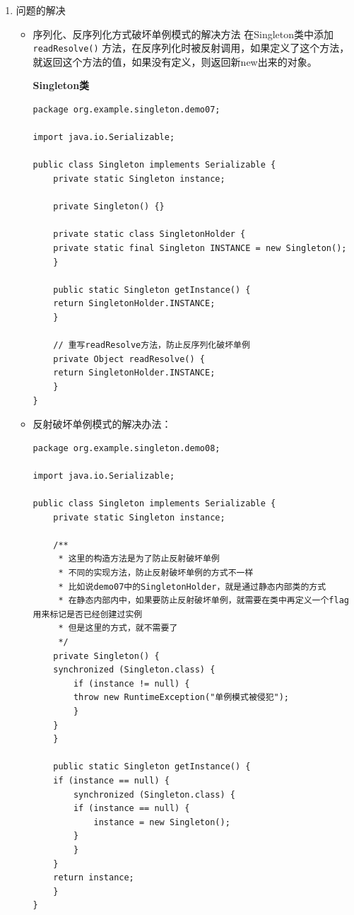 \documentclass[11pt]{article}
\begin{document}
\begin{enumerate}
\begin{itemize}
\begin{verbatim}
	// 获取无参构造方法
	Constructor cons = clazz.getDeclaredConstructor();

	// 取消访问检查
	cons.setAccessible(true);

	// 创建对象
	Singleton s1 = (Singleton) cons.newInstance();
	Singleton s2 = (Singleton) cons.newInstance();

	/**
	 * false
	 */
	System.out.println(s1 == s2);
    }
}

\end{verbatim}
\end{itemize}
\item 问题的解决
\label{sec:org3c0c33a}
\begin{itemize}
\item 序列化、反序列化方式破坏单例模式的解决方法
在Singleton类中添加 \texttt{readResolve()} 方法，在反序列化时被反射调用，如果定义了这个方法，就返回这个方法的值，如果没有定义，则返回新new出来的对象。

\textbf{Singleton类}
\begin{verbatim}
package org.example.singleton.demo07;

import java.io.Serializable;

public class Singleton implements Serializable {
    private static Singleton instance;

    private Singleton() {}

    private static class SingletonHolder {
	private static final Singleton INSTANCE = new Singleton();
    }

    public static Singleton getInstance() {
	return SingletonHolder.INSTANCE;
    }

    // 重写readResolve方法，防止反序列化破坏单例
    private Object readResolve() {
	return SingletonHolder.INSTANCE;
    }
}
\end{verbatim}

\item 反射破坏单例模式的解决办法：
\begin{verbatim}
package org.example.singleton.demo08;

import java.io.Serializable;

public class Singleton implements Serializable {
    private static Singleton instance;

    /**
     * 这里的构造方法是为了防止反射破坏单例
     * 不同的实现方法，防止反射破坏单例的方式不一样
     * 比如说demo07中的SingletonHolder，就是通过静态内部类的方式
     * 在静态内部内中，如果要防止反射破坏单例，就需要在类中再定义一个flag用来标记是否已经创建过实例
     * 但是这里的方式，就不需要了
     */
    private Singleton() {
	synchronized (Singleton.class) {
	    if (instance != null) {
		throw new RuntimeException("单例模式被侵犯");
	    }
	}
    }

    public static Singleton getInstance() {
	if (instance == null) {
	    synchronized (Singleton.class) {
		if (instance == null) {
		    instance = new Singleton();
		}
	    }
	}
	return instance;
    }
}

\end{verbatim}
\end{itemize}
\end{enumerate}
\end{document}
